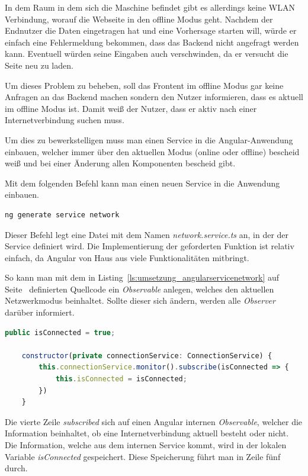In dem Raum in dem sich die Maschine befindet gibt es allerdings keine WLAN Verbindung, worauf die Webseite in den
offline Modus geht. Nachdem der Endnutzer die Daten eingetragen hat und eine Vorhersage starten will, würde er einfach
eine Fehlermeldung bekommen, dass das Backend nicht angefragt werden kann. Eventuell würden seine Eingaben auch
verschwinden, da er versucht die Seite neu zu laden.

Um dieses Problem zu beheben, soll das Frontent im offline Modus gar keine Anfragen an das Backend machen sondern den
Nutzer informieren, dass es aktuell im offline Modus ist. Damit weiß der Nutzer, dass er aktiv nach einer
Internetverbindung suchen muss.

Um dies zu bewerkstelligen muss man einen Service in die Angular-Anwendung einbauen, welcher immer über den aktuellen
Modus (online oder offline) bescheid weiß und bei einer Änderung allen Komponenten bescheid gibt.

Mit dem folgenden Befehl kann man einen neuen Service in die Anwendung einbauen.

\begin{lstlisting}[language=bash, caption=Hinzufügen eines Services, label=ls:umsetzung_angularaddservice]
    ng generate service network
\end{lstlisting}

Dieser Befehl legt eine Datei mit dem Namen \textit{network.service.ts} an, in der der Service definiert wird. Die
Implementierung der geforderten Funktion ist relativ einfach, da Angular von Haus aus viele Funktionalitäten mitbringt.

So kann man mit dem in Listing~\ref{ls:umsetzung_angularservicenetwork} auf
Seite~\pageref{ls:umsetzung_angularservicenetwork} definierten Quellcode ein \textit{Observable} anlegen, welches den
aktuellen Netzwerkmodus beinhaltet. Sollte dieser sich ändern, werden alle \textit{Observer} darüber informiert.

\begin{lstlisting}[language=JavaScript, caption=Funktion des Network-Services, label=ls:umsetzung_angularservicenetwork]
    public isConnected = true;

    constructor(private connectionService: ConnectionService) {
        this.connectionService.monitor().subscribe(isConnected => {
            this.isConnected = isConnected;
        })
    }
\end{lstlisting}

Die vierte Zeile \textit{subscribed} sich auf einen Angular internen \textit{Observable}, welcher die Information
beinhaltet, ob eine Internetverbindung aktuell besteht oder nicht. Die Information, welche aus dem internen Service
kommt, wird in der lokalen Variable \textit{isConnected} gespeichert. Diese Speicherung führt man in Zeile fünf durch.

